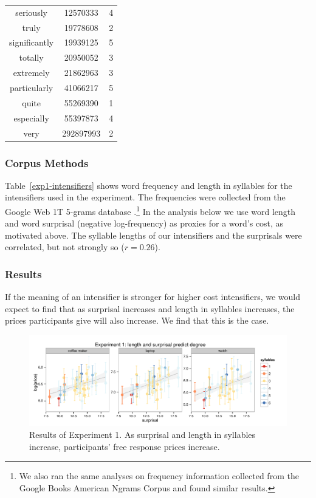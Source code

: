 \documentclass[10pt,letterpaper]{article}
\newcommand{\todo}[1]{{\color{red}#1}}
\begin{document}
\begin{table}[ht]
\begin{center}
\begin{tabular}{ccc}
    seriously & 12570333 & 4 \\
    truly & 19778608 & 2 \\
    significantly & 19939125 & 5 \\
    totally & 20950052 & 3 \\
    extremely & 21862963 & 3 \\
    particularly & 41066217 & 5 \\
    quite & 55269390 & 1 \\
    especially & 55397873 & 4 \\
    very & 292897993 & 2
  \end{tabular}
 \end{center}
\end{table}

\subsubsection{Corpus Methods}

Table~\ref{exp1-intensifiers} shows word frequency and length in syllables for the intensifiers used in the experiment.
The frequencies were collected from the Google Web 1T 5-grams database \cite{web1t5gram}.\footnote{
  We also ran the same analyses on frequency information collected from the Google Books American Ngrams Corpus \cite{books2011} and found similar results.
}
In the analysis below we use word length and word surprisal (negative log-frequency) as proxies for a word's cost, as motivated above.
The syllable lengths of our intensifiers and the surprisals %
were correlated, but not strongly so ($r = 0.26$).

\subsubsection{Results}

If the meaning of an intensifier is stronger for higher cost intensifiers, we would expect to find that as surprisal increases and length in syllables increases, the prices participants give will also increase. We find that this is the case.


\begin{figure}[ht]
\begin{center}
\includegraphics[width=\textwidth]{exp1.pdf}
\end{center}
\caption{Results of Experiment 1. As surprisal and length in syllables increase, participants' free response prices increase.} 
\label{exp1-plot}
\end{figure}
\end{document}

